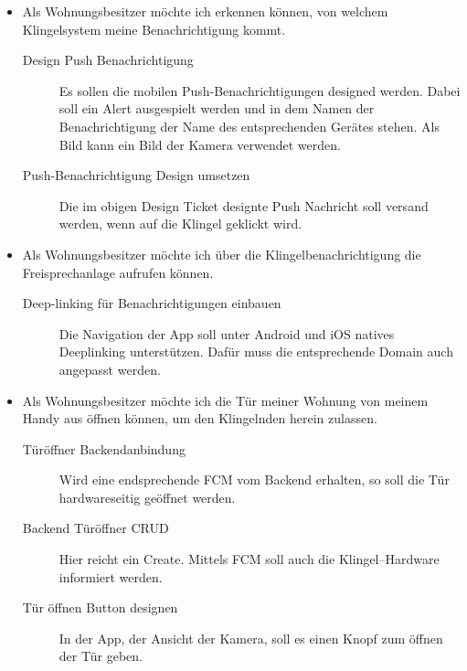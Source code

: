 \begin{itemize}
    \item Als Wohnungsbesitzer möchte ich erkennen können, von welchem Klingelsystem meine Benachrichtigung kommt.
        \begin{description}
            \item[Design Push Benachrichtigung] Es sollen die mobilen Push-Benachrichtigungen designed werden.
                Dabei soll ein Alert ausgespielt werden und in dem Namen der Benachrichtigung der Name des entsprechenden Gerätes stehen.
                Als Bild kann ein Bild der Kamera verwendet werden.
            \item[Push-Benachrichtigung Design umsetzen] Die im obigen Design Ticket designte Push Nachricht soll versand werden, wenn auf die Klingel geklickt wird.
        \end{description}
    \item Als Wohnungsbesitzer möchte ich über die Klingelbenachrichtigung die Freisprechanlage aufrufen können.
        \begin{description}
            \item[Deep-linking für Benachrichtigungen einbauen] Die Navigation der App soll unter Android und iOS natives Deeplinking unterstützen.
                Dafür muss die entsprechende Domain auch angepasst werden.
        \end{description}
    \item Als Wohnungsbesitzer möchte ich die Tür meiner Wohnung von meinem Handy aus öffnen können, um den Klingelnden herein zulassen.
        \begin{description}
            \item[Türöffner Backendanbindung] Wird eine endsprechende FCM vom Backend erhalten, so soll die Tür hardwareseitig geöffnet werden.
            \item[Backend Türöffner CRUD] Hier reicht ein Create.
                Mittels FCM soll auch die Klingel--Hardware informiert werden.
            \item[Tür öffnen Button designen] In der App, der Ansicht der Kamera, soll es einen Knopf zum öffnen der Tür geben.

\end{description}
\end{itemize}
